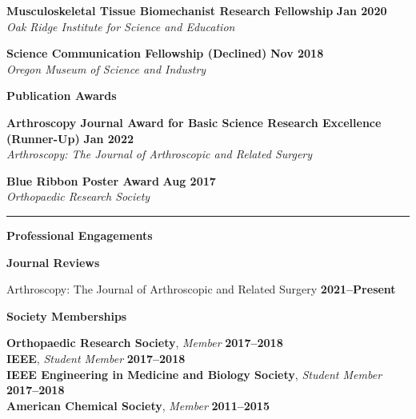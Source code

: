 \documentclass[10pt]{letter}
\begin{document}
\textbf{Musculoskeletal Tissue Biomechanist Research Fellowship}
\hfill
\textbf{Jan 2020} \\
\textit{Oak Ridge Institute for Science and Education}

\textbf{Science Communication Fellowship (Declined)}
\hfill
\textbf{Nov 2018} \\
\textit{Oregon Museum of Science and Industry} \\
\vspace{10pt}

\begin{center}
\textbf{Publication Awards} \\
\end{center}
\vspace{-5pt}
\textbf{Arthroscopy Journal Award for Basic Science Research Excellence (Runner-Up)}
\hfill
\textbf{Jan 2022} \\
\textit{Arthroscopy: The Journal of Arthroscopic and Related Surgery}

\textbf{Blue Ribbon Poster Award}
\hfill
\textbf{Aug 2017} \\
\textit{Orthopaedic Research Society} \\

\par\noindent\rule{\textwidth}{0.5pt}


\begin{center}
\textbf{\large Professional Engagements} \\
\end{center}
\vspace{-5pt}
\begin{center}
\textbf{Journal Reviews} \\
\end{center}
\vspace{-5pt}
Arthroscopy: The Journal of Arthroscopic and Related Surgery
\hfill
\textbf{2021--Present} \\

\begin{center}
\textbf{Society Memberships} \\
\end{center}
\vspace{-5pt}
\textbf{Orthopaedic Research Society}, \textit{Member}
\hfill
\textbf{2017--2018} \\
\vspace{0pt}
\textbf{IEEE}, \textit{Student Member}
\hfill
\textbf{2017--2018} \\
\vspace{0pt}
\textbf{IEEE Engineering in Medicine and Biology Society}, \textit{Student Member}
\hfill
\textbf{2017--2018} \\
\vspace{0pt}
\textbf{American Chemical Society}, \textit{Member}
\hfill
\textbf{2011--2015} \\
\end{document}
